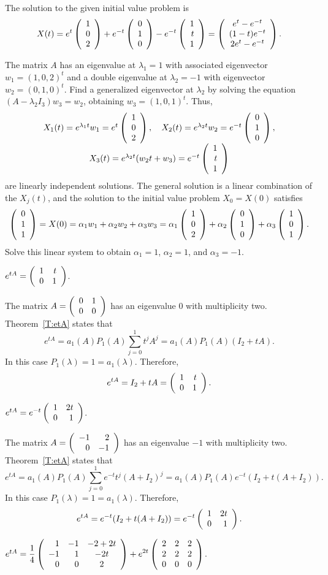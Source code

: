  \ans The solution to the given initial value problem is
\[
X(t) = e^t\left(\begin{array}{r} 1 \\ 0 \\ 2\end{array}\right) + e^{-t}\left(\begin{array}{r} 0 \\ 1 \\ 0\end{array}\right) -
e^{-t}\left(\begin{array}{r} 1 \\ t \\ 1\end{array}\right) =
\left(\begin{array}{c} e^t - e^{-t} \\ (1 - t)e^{-t} \\ 2e^t - e^{-t}\end{array}\right).
\]

\soln The matrix $A$ has an eigenvalue at $\lambda_1 = 1$ with associated
eigenvector $w_1 = (1,0,2)^t$ and a double eigenvalue at $\lambda_2 = -1$
with eigenvector $w_2 = (0,1,0)^t$.  Find a generalized eigenvector at
$\lambda_2$ by solving the equation $(A - \lambda_2I_3)w_3 = w_2$, obtaining
$w_3 = (1,0,1)^t$.  Thus,
\[
\begin{array}{c}
X_1(t) = e^{\lambda_1 t}w_1 = e^{t}\left(\begin{array}{r} 1 \\ 0 \\ 2\end{array}\right), \quad
X_2(t) = e^{\lambda_2 t}w_2 = e^{-t}\left(\begin{array}{r} 0 \\ 1 \\ 0\end{array}\right), \\
X_3(t) = e^{\lambda_2 t}(w_2t + w_3) = e^{-t}\left(\begin{array}{r} 1 \\ t \\ 1\end{array}\right)
\end{array}
\]
are linearly independent solutions.  The general solution is a linear
combination of the $X_j(t)$, and the solution to the initial value
problem $X_0 = X(0)$ satisfies
\[
\left(\begin{array}{r} 0 \\ 1 \\ 1\end{array}\right) = X(0) = \alpha_1w_1 + \alpha_2w_2 + \alpha_3w_3
= \alpha_1\left(\begin{array}{r} 1 \\ 0 \\ 2\end{array}\right) + \alpha_2\left(\begin{array}{r} 0 \\ 1 \\ 0\end{array}\right)
+ \alpha_3\left(\begin{array}{r} 1 \\ 0 \\ 1\end{array}\right).
\]
Solve this linear system to obtain $\alpha_1 = 1$,
$\alpha_2 = 1$, and $\alpha_3 = -1$.

 \ans $e^{tA} = \left(\begin{array}{rr} 1 & t\\ 0 &1\end{array}\right)$.

\soln The matrix $A = \left(\begin{array}{rr} 0 & 1\\ 0 &0\end{array}\right)$ has an eigenvalue $0$ with
multiplicity two.  Theorem~\ref{T:etA} states that 
\[
e^{tA} = a_1(A)P_1(A)\sum_{j=0}^1t^jA^j= a_1(A)P_1(A)(I_2+tA).
\]
In this case $P_1(\lambda)=1=a_1(\lambda)$.   Therefore,
\[
e^{tA} = I_2+tA = \left(\begin{array}{rr} 1 & t\\ 0 &1\end{array}\right).
\]


 \ans $e^{tA} = e^{-t}\left(\begin{array}{rr} 1 & 2t\\ 0 &1\end{array}\right)$.

\soln The matrix $A = \left(\begin{array}{rr} -1 & 2\\ 0 &-1\end{array}\right)$ has an eigenvalue $-1$ with
multiplicity two.  Theorem~\ref{T:etA} states that 
\[
e^{tA} = a_1(A)P_1(A)\sum_{j=0}^1e^{-t}t^j(A+I_2)^j=
a_1(A)P_1(A)e^{-t}(I_2+t(A+I_2)).
\]
In this case $P_1(\lambda)=1=a_1(\lambda)$.   Therefore,
\[
e^{tA} = e^{-t}(I_2+t(A+I_2)) = e^{-t}\left(\begin{array}{rr} 1 & 2t\\ 0 &1\end{array}\right).
\]


 \ans $e^{tA}= \displaystyle\frac{1}{4}\left(\begin{array}{rrc} 
1 & -1 & -2+2t\\ -1 & 1 & -2t \\ 0 & 0 & 2\end{array}\right) +e^{2t}\left(\begin{array}{rrr} 2 & 2 & 2\\  2 & 2 & 2 \\ 0 & 0 & 0 
\end{array}\right)$.

